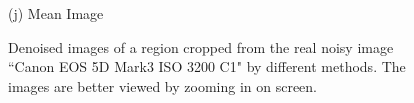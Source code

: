 \documentclass[10pt,onecolumn,letterpaper]{article}
\begin{document}
\begin{figure}[H]
{\begin{minipage}[t]{0.195\textwidth}
{\footnotesize (j) Mean Image \cite{crosschannel2016} }
\end{minipage}
}
\caption{Denoised images of a region cropped from the real noisy image ``Canon EOS 5D Mark3 ISO 3200 C1" \cite{crosschannel2016} by different methods. The images are better viewed by zooming in on screen.} 
\label{fig10}
\end{figure}

\begin{figure}[H]\vspace{1mm}
\centering
{}
\end{figure}
\end{document}
